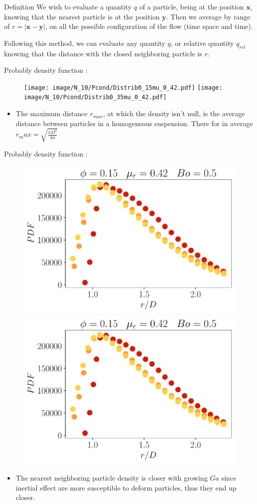 \documentclass[aspectratio=169]{beamer}
\begin{document}
\begin{frame}
  {Definition}
  We wish to evaluate a quantity $q$ of a particle, being at the position $\bm{x}$, knowing that the nearest particle is at the position $\bm{y}$. 
  Then we average by range of $r = |\bm{x} - \bm{y}|$, on all the possible configuration of the flow (time space and time). 

  Following this method, we can evaluate any quantity $q$, or relative quantity $q_{rel}$ knowing that the distance with the closed neighboring particle is $r$.

\end{frame}
\begin{frame}
  {Probably density function :}
  \begin{figure}
    \centering
    \texttt{[image: image/N\_10/Pcond/Distrib0\_15mu\_0\_42.pdf]}
    \texttt{[image: image/N\_10/Pcond/Distrib0\_35mu\_0\_42.pdf]}
  \end{figure}
  \begin{itemize}
  \item The maximum distance $r_{max}$, at which the density isn't null, is the average distance between particles in a homogeneous suspension. There for in average $r_max  = \sqrt{\frac{\pi D^2}{4 \phi}}$ 
\end{itemize} 
\end{frame}
\begin{frame}
  {Probably density function :}
  \begin{figure}
    \centering
    \includegraphics[height=  0.25\textwidth]{image/N_10/Pcond/Distrib0_15mu_0_42Bo_0_5.pdf}
    \includegraphics[height=  0.25\textwidth]{image/N_10/Pcond/Distrib0_15mu_0_42Bo_0_5.pdf}
  \end{figure}
  \begin{itemize}
    \item The nearest neighboring particle density is closer with growing $Ga$ since inertial effect are more susceptible to deform particles, thus they end up closer. 
  \end{itemize} 
\end{frame}
\end{document}
